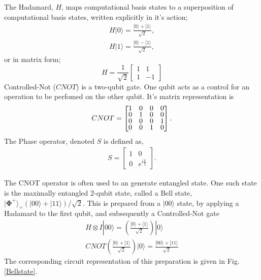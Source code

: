 The Hadamard, $H$, maps computational basis states to a superposition of computational basis states,
written explicitly in it's action;
\begin{align*}
    H |0\rangle = \frac{|0\rangle + |1\rangle}{\sqrt{2}}, \\
    H |1\rangle = \frac{|0\rangle - |1\rangle}{\sqrt{2}},
\end{align*}
or in matrix form;
\begin{equation*}
    H = \frac{1}{\sqrt{2}} \begin{bmatrix}
        1 & 1  \\
        1 & -1
    \end{bmatrix}
\end{equation*}
Controlled-Not ($CNOT$) is a two-qubit gate. One qubit acts as a control for an operation to be perfomed
on the other qubit.
It's matrix representation is
\begin{align}
    \label{CNOT}
    CNOT =
    \renewcommand{\arraystretch}{0.75}
    \begin{bmatrix}
        1 & 0 & 0 & 0 \\
        0 & 1 & 0 & 0 \\
        0 & 0 & 0 & 1 \\
        0 & 0 & 1 & 0
    \end{bmatrix}.
\end{align}
The Phase operator, denoted $S$ is defined as,
\begin{align*}
    S =
    \begin{bmatrix}
        1 & 0                  \\
        0 & e^{i\frac{\pi}{2}}
    \end{bmatrix}.
\end{align*}

The CNOT operator is often used to an generate entangled state. One such state is the maximally entangled 2-qubit state,
called a Bell state, $|{\bm\Phi}^{+}\rangle_ = (|00\rangle + |11\rangle)/\sqrt{2}$. This is prepared
from a $|00\rangle$ state, by applying a Hadamard to the first qubit, and subsequently a Controlled-Not gate
\begin{align}
    H \otimes I |00\rangle = \left (\frac{|0\rangle + |1\rangle }{\sqrt{2}}\right )|0\rangle \\
    CNOT \left (\frac{|0\rangle + |1\rangle }{\sqrt{2}}\right )|0\rangle = \frac{|00\rangle + |11\rangle}{\sqrt{2}}
\end{align}
The corresponding circuit representation of this preparation is given in Fig. \ref{Bellstate}.

